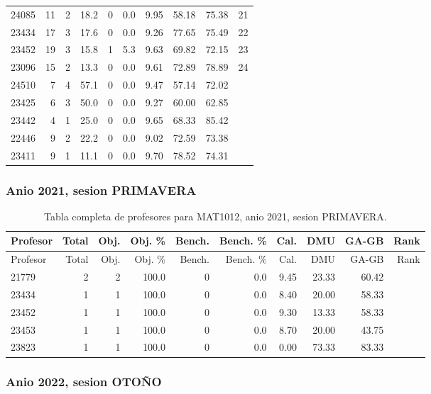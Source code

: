 \begin{longtable}{lrrrrrrrrr}
24085 & 11 & 2 & 18.2 & 0 & 0.0 & 9.95 & 58.18 & 75.38 & 21 \\
23434 & 17 & 3 & 17.6 & 0 & 0.0 & 9.26 & 77.65 & 75.49 & 22 \\
23452 & 19 & 3 & 15.8 & 1 & 5.3 & 9.63 & 69.82 & 72.15 & 23 \\
23096 & 15 & 2 & 13.3 & 0 & 0.0 & 9.61 & 72.89 & 78.89 & 24 \\
24510 & 7 & 4 & 57.1 & 0 & 0.0 & 9.47 & 57.14 & 72.02 &  \\
23425 & 6 & 3 & 50.0 & 0 & 0.0 & 9.27 & 60.00 & 62.85 &  \\
23442 & 4 & 1 & 25.0 & 0 & 0.0 & 9.65 & 68.33 & 85.42 &  \\
22446 & 9 & 2 & 22.2 & 0 & 0.0 & 9.02 & 72.59 & 73.38 &  \\
23411 & 9 & 1 & 11.1 & 0 & 0.0 & 9.70 & 78.52 & 74.31 &  \\
\bottomrule
\end{longtable}
\endgroup

\subsubsection{Anio 2021, sesion PRIMAVERA}

\begingroup
\scriptsize
\setlength{\tabcolsep}{3pt}
\begin{longtable}{lrrrrrrrrr}
\caption{Tabla completa de profesores para MAT1012, anio 2021, sesion PRIMAVERA.}\label{tab:prof-period-mat1012-2021-primavera}\\
\toprule
Profesor & Total & Obj. & Obj. \% & Bench. & Bench. \% & Cal. & DMU & GA-GB & Rank \\
\midrule
\endfirsthead
\toprule
Profesor & Total & Obj. & Obj. \% & Bench. & Bench. \% & Cal. & DMU & GA-GB & Rank \\
\midrule
\endhead
21779 & 2 & 2 & 100.0 & 0 & 0.0 & 9.45 & 23.33 & 60.42 &  \\
23434 & 1 & 1 & 100.0 & 0 & 0.0 & 8.40 & 20.00 & 58.33 &  \\
23452 & 1 & 1 & 100.0 & 0 & 0.0 & 9.30 & 13.33 & 58.33 &  \\
23453 & 1 & 1 & 100.0 & 0 & 0.0 & 8.70 & 20.00 & 43.75 &  \\
23823 & 1 & 1 & 100.0 & 0 & 0.0 & 0.00 & 73.33 & 83.33 &  \\
\bottomrule
\end{longtable}
\endgroup

\subsubsection{Anio 2022, sesion OTOÑO}

